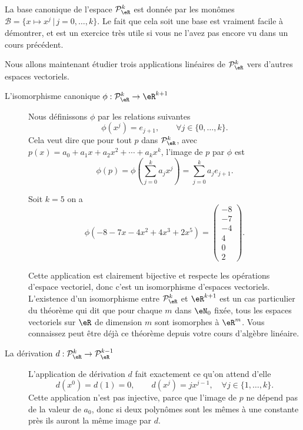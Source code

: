 La base canonique de l'espace \( \mathcal{P}_\eR^k\) est donnée par les monômes \( \mathcal{B}=\{x\mapsto x^j \,|\, j=0, \ldots, k\}\). Le fait que cela soit une base est vraiment facile à démontrer, et est un exercice très utile si vous ne l'avez pas encore vu dans un cours précédent.

Nous allons maintenant étudier trois applications linéaires de \( \mathcal{P}_\eR^k\) vers d'autres espaces vectoriels.
\begin{description}
	\item[L'isomorphisme canonique  \( \phi:\mathcal{P}_\eR^k \to\eR^{k+1}\)] Nous définissons \( \phi\) par les relations suivantes
	      \[
		      \phi(x^j)=e_{j+1}, \qquad \forall j\in\{0,\dots, k\}.
	      \]
	      Cela veut dire que pour tout \( p\) dans \( \mathcal{P}_\eR^k\), avec \( p(x)=a_0+a_1 x +a_2 x^2 + \cdots+a_k x^k\), l'image de \( p\) par \( \phi\) est
	      \[
		      \phi(p)=\phi\left(\sum_{j=0}^k a_j x^j\right)=\sum_{j=0}^k a_j e_{j+1}.
	      \]
	      \begin{example} Soit \( k=5\) on a
		      \begin{equation}
			      \phi(-8-7x-4x^2+4x^3+2x^5)=
			      \begin{pmatrix}
				      -8 \\
				      -7 \\
				      -4 \\
				      4  \\
				      0  \\
				      2
			      \end{pmatrix}.
		      \end{equation}
	      \end{example}

	      Cette application est clairement bijective et respecte les opérations d'espace vectoriel, donc c'est un isomorphisme d'espaces vectoriels. L'existence d'un isomorphisme entre \( \mathcal{P}_\eR^k\)  et \( \eR^{k+1}\) est un cas particulier du théorème qui dit que  pour chaque \( m\) dans \( \eN_0\) fixée, tous les espaces vectoriels sur \( \eR\) de dimension \( m\) sont isomorphes à \( \eR^m\). Vous connaissez peut être déjà ce théorème depuis votre cours d'algèbre linéaire.
	\item[La dérivation \( d: \mathcal{P}_\eR^k \to \mathcal{P}_\eR^{k-1}\)] L'application de dérivation \( d\) fait exactement ce qu'on attend d'elle
	      \[
		      d(x^0)=d(1)=0, \qquad d(x^j)=j x^{j-1}, \quad \forall j\in\{1,\dots, k\}.
	      \]
	      Cette application n'est pas injective, parce que l'image de \( p\) ne dépend pas de la valeur de \( a_0\), donc si deux polynômes sont les mêmes à une constante près ils auront la même image par \( d\).


\end{description}

